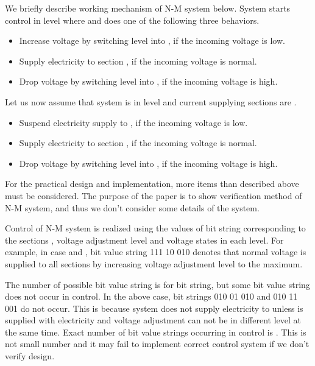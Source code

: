 \documentclass[runningheads,a4paper]{llncs}
\begin{document}
 We briefly describe working mechanism of N-M system below. 
System starts control in level  where   and does one of the following three behaviors. 
\begin{itemize}
\item Increase voltage by switching level into , if the incoming voltage is low.

\item  Supply electricity to section , if the incoming voltage is normal. 

\item Drop voltage by switching level into , if the incoming voltage is high.
\end{itemize}

Let us now assume that system is in level  and current supplying sections are .

\begin{itemize}
\item Suspend electricity supply to , if the incoming voltage is low.

\item  Supply electricity to section , if the incoming voltage is normal. 

\item  Drop voltage by switching level into , if the incoming voltage is high.
\end{itemize}

For the practical design and implementation, more items than described above must be considered. The purpose of the paper is to show verification method of N-M system, and thus we don’t consider some details of the system. 

Control of N-M system is realized using the values of  bit string corresponding to the sections , voltage adjustment level   and voltage states  in each level. For example, in case  and , bit value string 111 10 010 denotes that normal voltage is supplied to all sections by increasing voltage adjustment level to the maximum. 

The number of possible bit value string is  for  bit string, but some bit value string does not occur in control. In the above case, bit strings 010 01 010 and 010 11 001 do not occur. This is because system does not supply electricity to  unless  is supplied with electricity and voltage adjustment can not be in different level at the same time. Exact number of bit value strings occurring in control is . This is not small number and it may fail to implement correct control system if we don't verify design.
\end{document}
